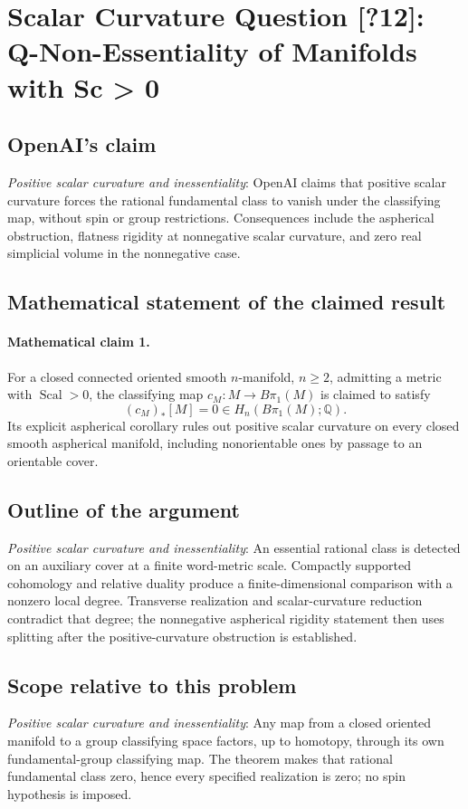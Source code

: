 \documentclass[11pt]{article}
\begin{document}
\section*{Scalar Curvature Question [?12]: Q-Non-Essentiality of Manifolds with Sc > 0}

\subsection{OpenAI's claim}
\textit{Positive scalar curvature and inessentiality}: OpenAI claims that positive scalar curvature forces the rational fundamental class to vanish under the classifying map, without spin or group restrictions. Consequences include the aspherical obstruction, flatness rigidity at nonnegative scalar curvature, and zero real simplicial volume in the nonnegative case.

\subsection{Mathematical statement of the claimed result}
\paragraph{Mathematical claim 1.} For a closed connected oriented smooth $n$-manifold, $n\ge2$, admitting a metric with $\operatorname{Scal}>0$, the classifying map $c_M:M\to B\pi_1(M)$ is claimed to satisfy \[(c_M)_*[M]=0\in H_n(B\pi_1(M);\mathbb Q).\] Its explicit aspherical corollary rules out positive scalar curvature on every closed smooth aspherical manifold, including nonorientable ones by passage to an orientable cover.

\subsection{Outline of the argument}
\textit{Positive scalar curvature and inessentiality}: An essential rational class is detected on an auxiliary cover at a finite word-metric scale. Compactly supported cohomology and relative duality produce a finite-dimensional comparison with a nonzero local degree. Transverse realization and scalar-curvature reduction contradict that degree; the nonnegative aspherical rigidity statement then uses splitting after the positive-curvature obstruction is established.

\subsection{Scope relative to this problem}
\textit{Positive scalar curvature and inessentiality}: Any map from a closed oriented manifold to a group classifying space factors, up to homotopy, through its own fundamental-group classifying map. The theorem makes that rational fundamental class zero, hence every specified realization is zero; no spin hypothesis is imposed.
\end{document}
